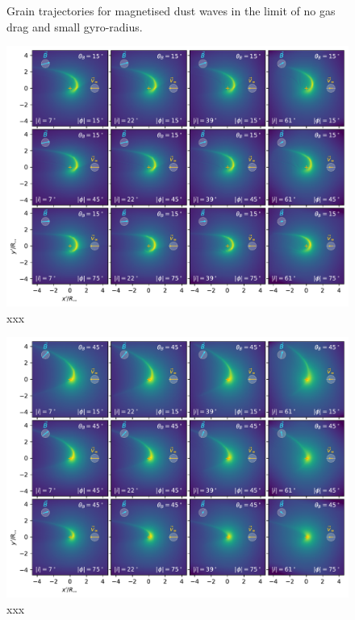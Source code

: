 \begin{figure}
  \caption{Grain trajectories for magnetised dust waves in the limit
    of no gas drag and small gyro-radius. }
  \label{fig:magnetic-dust-waves}
\end{figure}


\begin{figure}
  \includegraphics[width=\linewidth]{figs/multi-view-dust-bfield-15}
  \caption{xxx}
  \label{fig:projected-magnetic-dust-waves-15}
\end{figure}
\begin{figure}
  \includegraphics[width=\linewidth]{figs/multi-view-dust-bfield-45}
  \caption{xxx}
  \label{fig:projected-magnetic-dust-waves-45}
\end{figure}
